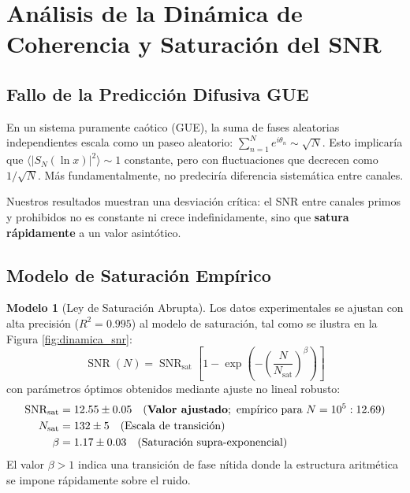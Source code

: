 \documentclass[12pt, a4paper]{article}
\theoremstyle{plain}
\theoremstyle{definition}
\newtheorem{modelo}[teorema]{Modelo} %
\theoremstyle{remark}
\newcommand{\SNR}{\operatorname{SNR}}
\begin{document}
\section{Análisis de la Dinámica de Coherencia y Saturación del SNR}
\label{sec:analisis}

\subsection{Fallo de la Predicción Difusiva GUE}
\label{subsec:fallo_gue}

En un sistema puramente caótico (GUE), la suma de fases aleatorias independientes escala como un paseo aleatorio: $\sum_{n=1}^N e^{i\theta_n} \sim \sqrt{N}$. Esto implicaría que $\langle |S_N(\ln x)|^2 \rangle \sim 1$ constante, pero con fluctuaciones que decrecen como $1/\sqrt{N}$. Más fundamentalmente, no predeciría diferencia sistemática entre canales.

Nuestros resultados muestran una desviación crítica: el SNR entre canales primos y prohibidos no es constante ni crece indefinidamente, sino que \textbf{satura rápidamente} a un valor asintótico.

\subsection{Modelo de Saturación Empírico}
\label{subsec:modelo_saturacion}

\begin{modelo}[Ley de Saturación Abrupta]
Los datos experimentales se ajustan con alta precisión ($R^2 = 0.995$) al modelo de saturación, tal como se ilustra en la Figura \ref{fig:dinamica_snr}:
\[
\SNR(N) = \SNR_{\text{sat}} \left[ 1 - \exp\left(-\left(\frac{N}{N_{\text{sat}}}\right)^\beta\right) \right]
\]
con parámetros óptimos obtenidos mediante ajuste no lineal robusto:
\begin{align*}
\SNR_{\text{sat}} &= 12.55 \pm 0.05 \quad (\text{\textbf{Valor ajustado}}; \text{ empírico para } N=10^5: 12.69) \\
N_{\text{sat}} &= 132 \pm 5 \quad (\text{Escala de transición}) \\
\beta &= 1.17 \pm 0.03 \quad (\text{Saturación supra-exponencial})
\end{align*}
El valor $\beta > 1$ indica una transición de fase nítida donde la estructura aritmética se impone rápidamente sobre el ruido.
\end{modelo}
\end{document}
